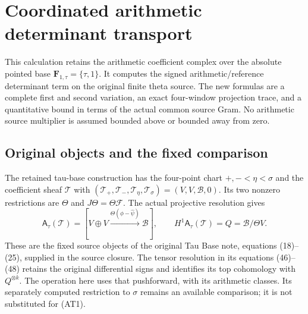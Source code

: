 \documentclass[10pt,a4paper,oneside]{report}
\begin{document}

\endgroup
\clearpage
\chapter{Coordinated arithmetic determinant transport}
\begingroup
\newcommand{\C}{\mathbb C}
\newcommand{\Tr}{\operatorname{Tr}}
\newcommand{\im}{\operatorname{im}}
\newcommand{\ar}{\mathrm{ar}}
\newcommand{\Ga}{\Gamma}
\newcommand{\cP}{\mathcal P}
\newcommand{\cB}{\mathcal B}
\newcommand{\cR}{\mathcal R}



This calculation retains the arithmetic coefficient complex over the
absolute pointed base $\mathbf F_{1,\tau}=\{\tau,1\}$. It computes the
signed arithmetic/reference determinant term on the original finite
theta source. The new formulas are a complete first and second variation,
an exact four-window projection trace, and a quantitative bound in terms
of the actual common source Gram. No arithmetic source multiplier is
assumed bounded above or bounded away from zero.

\section{Original objects and the fixed comparison}

The retained tau-base construction has the four-point chart
$+,-<\eta<\sigma$ and the coefficient sheaf $\mathcal T$ with
$(\mathcal T_+,\mathcal T_-,\mathcal T_\eta,\mathcal T_\sigma)
=(V,V,\mathscr B,0)$. Its two nonzero restrictions are $\Theta$ and
$J\Theta=\Theta\mathcal F$. The actual projective resolution gives
\[
 \mathsf A_\tau(\mathcal T)
 =[V\oplus V\xrightarrow{\Theta(\phi-\widehat\psi)}\mathscr B],
 \qquad H^1\mathsf A_\tau(\mathcal T)=Q=\mathscr B/\Theta V.
 \tag{AT1}
\]
These are the fixed source objects of the original Tau Base note,
equations (18)--(25), supplied in the source closure. The tensor
resolution in its equations (46)--(48) retains the original differential
signs and identifies its top cohomology with $Q^{\otimes k}$.
The operation here uses that pushforward, with its arithmetic classes.
Its separately computed restriction to $\sigma$ remains an available
comparison; it is not substituted for (AT1).
\end{document}

